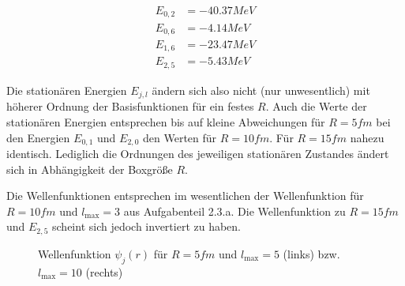 \begin{align}
  E_{0,2} &= \unit{-40.37}{MeV} \\
  E_{0,6} &= \unit{-4.14}{MeV} \\
  E_{1,6} &= \unit{-23.47}{MeV} \\
  E_{2,5} &= \unit{-5.43}{MeV}
\end{align}

Die stationären Energien $E_{j,l}$ ändern sich also nicht (nur
unwesentlich) mit höherer Ordnung der Basisfunktionen für ein festes
$R$. Auch die Werte der stationären Energien entsprechen bis auf
kleine Abweichungen für $R = \unit{5}{fm}$ bei den Energien $E_{0,1}$
und $E_{2,0}$ den Werten für $R = \unit{10}{fm}$. Für $R =
\unit{15}{fm}$ nahezu identisch. Lediglich die Ordnungen des
jeweiligen stationären Zustandes ändert sich in Abhängigkeit der
Boxgröße $R$.

Die Wellenfunktionen entsprechen im wesentlichen der Wellenfunktion
für $R = \unit{10}{fm}$ und $l_{\max} = 3$ aus Aufgabenteil 2.3.a. Die
Wellenfunktion zu $R = \unit{15}{fm}$ und $E_{2,5}$ scheint sich
jedoch invertiert zu haben.

\begin{figure}[htbp]
  \centering
  \caption{Wellenfunktion $\psi_j(r)$ für $R = \unit{5}{fm}$ und
    $l_{\max} = 5$ (links) bzw. $l_{\max} = 10$ (rechts)}
  \label{img.psi-var-5}
\end{figure}

